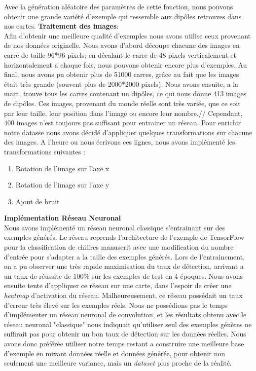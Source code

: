 \documentclass[a4paper, 12pt, titlepage, oneside, french]{article}
\begin{document}
	Avec la génération aléatoire des paramètres de cette fonction, nous pouvons obtenir une grande variété d'exemple qui ressemble aux dipôles retrouves dans nos cartes. 
	\textbf{Traitement des images}:\\
	\indent Afin d'obtenir une meilleure qualité d'exemples nous avons utilise ceux provenant de nos données originelle. Nous avons d'abord découpe chacune des images en carre de taille 96*96 pixels; en décalant le carre de 48 pixels verticalement et horizontalement a chaque fois, nous pouvons obtenir encore plus d'exemples. Au final, nous avons pu obtenir plus de 51000 carres, grâce au fait que les images était très grande (souvent plus de 2000*2000 pixels). Nous avons ensuite, a la main, trouve tous les carres contenant un dipôles, ce qui nous donne 413 images de dipôles. Ces images, provenant du monde réelle sont très variée, que ce soit par leur taille, leur position dans l'image ou encore leur nombre.//
	Cependant, 400 images n'est toujours pas suffisant pour entrainer un réseau. Pour enrichir notre datasse nous avons décidé d'appliquer quelques transformations sur chacune des images. A l'heure ou nous écrivons ces lignes, nous avons implémenté les transformations suivantes :
	\begin{enumerate}
		\item Rotation de l'image sur l'axe x 
		\item Rotation de l'image sur l'axe y
		\item Ajout de bruit
	\end{enumerate}
	
	\textbf{Implémentation Réseau Neuronal}\\
	\indent Nous avons implémenté un réseau neuronal classique s'entrainant sur des exemples générés. Le réseau reprends l'architecture de l'exemple de TensorFlow pour la classification de chiffres manuscrit avec une modification du nombre d'entrée pour s'adapter a la taille des exemples générés. Lors de l'entrainement, on a pu observer une très rapide maximisation du taux de détection, arrivant a un taux de réussite de 100\% sur les exemples de test en 4 époques. Nous avons ensuite tente d'appliquer ce réseau sur une carte, dans l'espoir de créer une \textit{heatmap} d'activation du réseau. Malheureusement, ce réseau possédait un taux d'erreur très élevé sur les exemples réels. Nous ne possédions pas le temps d'implémenter un réseau neuronal de convolution, et les résultats obtenu avec le réseau neuronal "classique" nous indiquait qu'utiliser seul des exemples génères ne suffirait pas pour obtenir un bon taux de détection sur les données réelles. Nous avons donc préférée utiliser notre temps restant a construire une meilleure base d'exemple en mixant données réelle et données générée, pour obtenir non seulement une meilleure variance, mais un \textit{dataset} plus proche de la réalité.
\newpage
\end{document}
